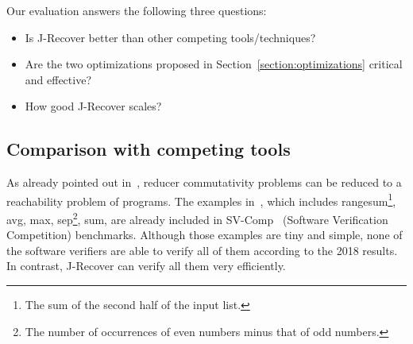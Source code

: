 \documentclass{llncs}
\begin{document}
Our evaluation answers the following three questions:
\begin{itemize}
	\item Is J-Recover better than other competing tools/techniques?
	\item Are the two optimizations proposed in Section~\ref{section:optimizations} critical and effective?
	\item How good J-Recover scales?
\end{itemize} 

\subsection{Comparison with competing tools}
As already pointed out in~\cite{ChenHSW15}, reducer commutativity problems can be reduced to a reachability problem of programs. 
The examples in~\cite{ChenHSW15}, which includes \textsf{rangesum}\footnote{The sum of the second half of the input list.}, \textsf{avg}, \textsf{max}, \textsf{sep}\footnote{The number of occurrences of even numbers minus that of odd numbers.}, \textsf{sum}, are already included in SV-Comp~\cite{svcomp} (Software Verification Competition) benchmarks.
Although those examples are tiny and simple, none of the software verifiers are able to verify all of them according to the 2018 results. In contrast, J-Recover can verify all them very efficiently. 
\end{document}
